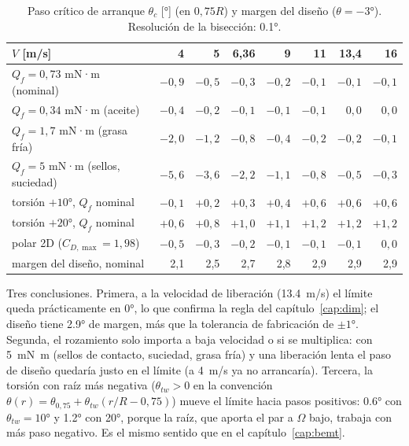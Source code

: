 \begin{table}[H]
\centering
\caption{Paso crítico de arranque $\theta_c$ [\si{\degree}] (en $0{,}75R$) y margen del
diseño ($\theta=\ang{-3}$). Resolución de la bisección: \ang{0.1}.}
\label{tab:arranque-mapa}
\begin{tabular}{lrrrrrrr}
\toprule
$V$ [m/s] & 4 & 5 & 6,36 & 9 & 11 & 13,4 & 16 \\
\midrule
$Q_f=0{,}73$ mN·m (nominal) & $-0{,}9$ & $-0{,}5$ & $-0{,}3$ & $-0{,}2$ & $-0{,}1$ & $-0{,}1$ & $-0{,}1$ \\
$Q_f=0{,}34$ mN·m (aceite) & $-0{,}4$ & $-0{,}2$ & $-0{,}1$ & $-0{,}1$ & $-0{,}1$ & $0{,}0$ & $0{,}0$ \\
$Q_f=1{,}7$ mN·m (grasa fría) & $-2{,}0$ & $-1{,}2$ & $-0{,}8$ & $-0{,}4$ & $-0{,}2$ & $-0{,}2$ & $-0{,}1$ \\
$Q_f=5$ mN·m (sellos, suciedad) & $-5{,}6$ & $-3{,}6$ & $-2{,}2$ & $-1{,}1$ & $-0{,}8$ & $-0{,}5$ & $-0{,}3$ \\
torsión $+\ang{10}$, $Q_f$ nominal & $-0{,}1$ & $+0{,}2$ & $+0{,}3$ & $+0{,}4$ & $+0{,}6$ & $+0{,}6$ & $+0{,}6$ \\
torsión $+\ang{20}$, $Q_f$ nominal & $+0{,}6$ & $+0{,}8$ & $+1{,}0$ & $+1{,}1$ & $+1{,}2$ & $+1{,}2$ & $+1{,}2$ \\
polar 2D ($C_{D,\max}=1{,}98$) & $-0{,}5$ & $-0{,}3$ & $-0{,}2$ & $-0{,}1$ & $-0{,}1$ & $-0{,}1$ & $0{,}0$ \\
\midrule
margen del diseño, nominal & 2,1 & 2,5 & 2,7 & 2,8 & 2,9 & 2,9 & 2,9 \\
\bottomrule
\end{tabular}
\end{table}

Tres conclusiones. Primera, a la velocidad de liberación (\SI{13.4}{m/s}) el límite queda
prácticamente en \ang{0}, lo que confirma la regla del capítulo~\ref{cap:dim}; el diseño
tiene \ang{2.9} de margen, más que la tolerancia de fabricación de $\pm\ang{1}$. Segunda, el
rozamiento solo importa a baja velocidad o si se multiplica: con \SI{5}{mN.m} (sellos de
contacto, suciedad, grasa fría) y una liberación lenta el paso de diseño quedaría justo en el
límite (a \SI{4}{m/s} ya no arrancaría). Tercera, la torsión con raíz más negativa
($\theta_{tw}>0$ en la convención
$\theta(r)=\theta_{0,75}+\theta_{tw}(r/R-0{,}75)$) mueve el límite hacia pasos positivos:
\ang{0.6} con $\theta_{tw}=\ang{+10}$ y \ang{1.2} con \ang{+20}, porque la raíz, que aporta
el par a $\Omega$ bajo, trabaja con más paso negativo. Es el mismo sentido que en el
capítulo~\ref{cap:bemt}.

